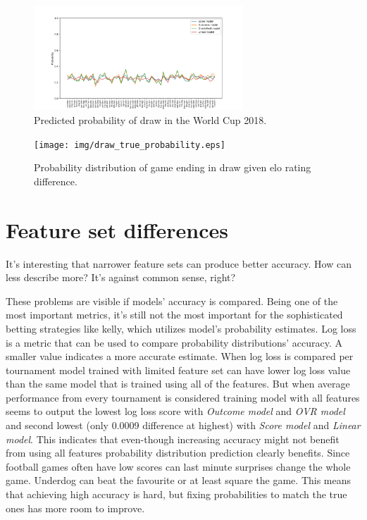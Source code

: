 \begin{figure}[H]
    \centering
    \includegraphics[width=0.7\textwidth]{img/match_level_2018_model_probability_draw_prob.png}
    \caption{Predicted probability of draw in the World Cup 2018.}
    \label{fig:draw_probability}
\end{figure}

\begin{figure}[H]
    \centering
    \texttt{[image: img/draw\_true\_probability.eps]}
    \caption{Probability distribution of game ending in draw given elo rating difference.}
    \label{fig:draw_prob_dist}
\end{figure}


\section{Feature set differences}
It's interesting that narrower feature sets can produce better accuracy. How can less describe more? It's against common sense, right?

These problems are visible if models' accuracy is compared. Being one of the most important metrics, it's still not the most important for the sophisticated betting strategies like kelly, which utilizes model's probability estimates. Log loss
is a metric that can be used to compare probability distributions' accuracy. A smaller value indicates a more accurate estimate. When log loss is compared per tournament model trained with limited feature set can have lower log loss value than the same model that is trained using all of the features. But when average performance from every tournament is considered training model with all features seems to output the lowest log loss score with \textit{Outcome model} and \textit{OVR model} and second lowest (only 0.0009 difference at highest) with \textit{Score model} and \textit{Linear model}. This indicates that even-though increasing accuracy might not benefit from using all features probability distribution prediction clearly benefits. Since football games often have low scores can last minute surprises change the whole game. Underdog can beat the favourite or at least square the game. This means that achieving high accuracy is hard, but fixing probabilities to match the true ones has more room to improve.

